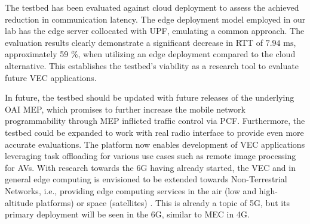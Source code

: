 \documentclass[12pt,a4paper,twoside]{report}
\begin{document}
The testbed has been evaluated against cloud deployment to assess the achieved reduction in communication latency. The edge deployment model employed in our lab has the edge server collocated with UPF, emulating a common approach. The evaluation results clearly demonstrate a significant decrease in RTT of $7.94 \mbox{ ms}$, approximately 59 \%, when utilizing an edge deployment compared to the cloud alternative. This establishes the testbed’s viability as a research tool to evaluate future VEC applications. 

In future, the testbed should be updated with future releases of the underlying OAI MEP, which promises to further increase the mobile network programmability through MEP inflicted traffic control via PCF. Furthermore, the testbed could be expanded to work with real radio interface to provide even more accurate evaluations. The platform now enables development of VEC applications leveraging task offloading for various use cases such as remote image processing for AVs. With research towards the 6G having already started, the VEC and in general edge computing is envisioned to be extended towards Non-Terrestrial Networks, i.e., providing edge computing services in the air (low and high-altitude platforms) or space (satellites) \cite{araniti2021toward6G}. This is already a topic of 5G, but its primary deployment will be seen in the 6G, similar to MEC in 4G.





\clearpage

%

%
%
	
	
\end{document}
